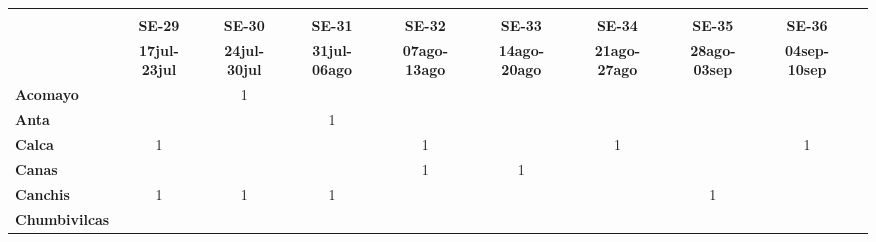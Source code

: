 \begin{tabular}{lccccccccc}
	\textbf{}              	  
	& \multicolumn{1}{l}{}                        
	& \multicolumn{1}{l}{}      
	& \multicolumn{1}{l}{}                         
	& \multicolumn{1}{l}{}                         
	& \multicolumn{1}{l}{}                         
	& \multicolumn{1}{l}{}                        
	& \multicolumn{1}{l}{}                         
	& \multicolumn{1}{l}{} \\                   
	\textbf{}                                                                     	
	&\textbf{SE-29} 							
	&\textbf{SE-30}						
	&\textbf{SE-31} 							
	&\textbf{SE-32}						
	&\textbf{SE-33}								
	&\textbf{SE-34}					
	&\textbf{SE-35}								&\textbf{SE-36}\\							
	\textbf{}              	  							&\textbf{17jul-23jul}						
	&\textbf{24jul-30jul}						&\textbf{31jul-06ago}						
	&\textbf{07ago-13ago}						&\textbf{14ago-20ago}						
	&\textbf{21ago-27ago}						
	&\textbf{28ago-03sep}
	&\textbf{04sep-10sep}\\
	\textbf{Acomayo}                        						
	&\cellcolor[HTML]{FCC46C}
	&1											
	&\cellcolor[HTML]{FCC46C}
	&\cellcolor[HTML]{FCC46C}					
	&\cellcolor[HTML]{FCC46C}
	&\cellcolor[HTML]{FCC46C}					
	&\cellcolor[HTML]{FCC46C}
	&\cellcolor[HTML]{FCC46C}\\
	\textbf{Anta}                                                   		
	&\cellcolor[HTML]{FCC46C}					
	&\cellcolor[HTML]{FCC46C}					&1											
	&\cellcolor[HTML]{FCC46C}					&\cellcolor[HTML]{FCC46C}					
	&\cellcolor[HTML]{FCC46C}					
	&\cellcolor[HTML]{FCC46C}
	&\cellcolor[HTML]{FCC46C}	\\					
	\textbf{Calca}      				       								        &1  										
	&\cellcolor[HTML]{FCC46C}	 	 	    	&\cellcolor[HTML]{FCC46C}					
	&1											&\cellcolor[HTML]{FCC46C}					
	&1											
	&\cellcolor[HTML]{FCC46C}
	&1\\          			
	\textbf{Canas}                              									
	&\cellcolor[HTML]{FCC46C}
	&\cellcolor[HTML]{FCC46C}					
	&\cellcolor[HTML]{FCC46C}
	&1											
	&1
	&\cellcolor[HTML]{FCC46C}					
	&\cellcolor[HTML]{FCC46C}
	&\cellcolor[HTML]{FCC46C}	\\	
	\textbf{Canchis}                             									
	&1											
	&1											
	&1			
	&\cellcolor[HTML]{FCC46C}					
	&\cellcolor[HTML]{FCC46C}			
	&\cellcolor[HTML]{FCC46C}					
	&1
	&\cellcolor[HTML]{FCC46C}\\											
	\textbf{Chumbivilcas}                      									

\end{tabular}
